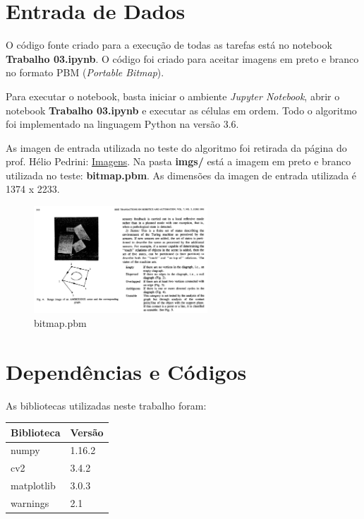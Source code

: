 \documentclass[twoside,twocolumn]{article}
\begin{document}

\section{Entrada de Dados}

O código fonte criado para a execução de todas as tarefas está no notebook \textbf{Trabalho 03.ipynb}. O código foi criado para aceitar imagens em preto e branco no formato PBM (\textit{Portable Bitmap}).

Para executar o notebook, basta iniciar o ambiente \textit{Jupyter Notebook}, abrir o notebook \textbf{Trabalho 03.ipynb} e executar as células em ordem. Todo o algoritmo foi implementado na linguagem Python na versão 3.6.

As imagen de entrada utilizada no teste do algoritmo foi retirada da página do prof. Hélio Pedrini: \href{http://www.ic.unicamp.br/~helio/imagens_morfologia/}{Imagens}. Na pasta \textbf{imgs/} está a imagem em preto e branco utilizada no teste: \textbf{bitmap.pbm}. As dimensões da imagen de entrada utilizada é 1374 x 2233.

\begin{figure}[H]
\begin{center}
	\includegraphics[height=4cm]{figures/bitmap.png}
\caption{bitmap.pbm} \label{gdimotes}
\end{center}
\end{figure}


\section{Dependências e Códigos}

As bibliotecas utilizadas neste trabalho foram:

\begin{table}[H]
\begin{tabular}{|l|l|}
\hline
\textbf{Biblioteca} & \textbf{Versão} \\ \hline
numpy               & 1.16.2          \\ \hline
cv2                 & 3.4.2           \\ \hline
matplotlib          & 3.0.3           \\ \hline
warnings            & 2.1             \\ \hline
\end{tabular}
\end{table}
\end{document}

